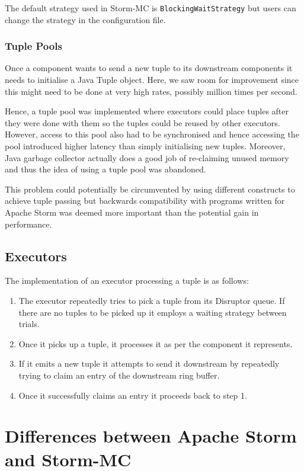 \documentclass[bsc,logo,frontabs,twoside,singlespacing,normalheadings,parskip]{infthesis}\usepackage[]{graphicx}\usepackage[]{color}
\begin{document}
The default strategy used in Storm-MC is \texttt{BlockingWaitStrategy} but users can change the strategy in the configuration file.

\subsubsection{Tuple Pools}

Once a component wants to send a new tuple to its downstream components it needs to initialise a Java Tuple object. Here, we saw room for improvement since this might need to be done at very high rates, possibly million times per second.

Hence, a tuple pool was implemented where executors could place tuples after they were done with them so the tuples could be reused by other executors. However, access to this pool also had to be synchronised and hence accessing the pool introduced higher latency than simply initialising new tuples. Moreover, Java garbage collector actually does a good job of re-claiming unused memory and thus the idea of using a tuple pool was abandoned.

This problem could potentially be circumvented by using different constructs to achieve tuple passing but backwards compatibility with programs written for Apache Storm was deemed more important than the potential gain in performance.

\subsection{Executors}

The implementation of an executor processing a tuple is as follows:

\begin{enumerate}
	\item The executor repeatedly tries to pick a tuple from its Disruptor queue. If there are no tuples to be picked up it employs a waiting strategy between trials.
	\item Once it picks up a tuple, it processes it as per the component it represents.
	\item If it emits a new tuple it attempts to send it downstream by repeatedly trying to claim an entry of the downstream ring buffer.
	\item Once it successfully claims an entry it proceeds back to step 1.
\end{enumerate}

\section{Differences between Apache Storm and Storm-MC}
\label{sec:differences}
\end{document}
